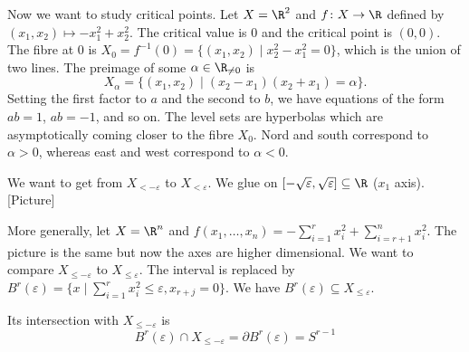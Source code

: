 \documentclass[A4paper, british]{amsart}
\theoremstyle{darkgreentheorem}
\theoremstyle{darkbluedefinition}
\theoremstyle{darkredexample}
\theoremstyle{remark}
\newcommand{\1}{\mathbbm{1}}
\newcommand{\sub}{\subseteq}
\begin{document}
Now we want to study critical points.
Let $X=\R^{2}$ and $f\colon X\to \R$ defined by $(x_{1},x_{2})\mapsto -x_{1}^{2}+x_{2}^{2}$.
The critical value is $0$ and the critical point is $(0,0)$.
The fibre at $0$ is $X_{0}=f^{-1}(0)=\{(x_{1},x_{2})\mid x_{2}^{2}-x_{1}^{2}=0 \}$, which is the union of two lines.
The preimage of some $\alpha\in \R_{\neq 0}$ is
\[ X_{\alpha}=\{(x_{1},x_{2})\mid (x_{2}-x_{1})(x_{2}+x_{1})=\alpha \}. \]
Setting the first factor to $a$ and the second to $b$, we have equations of the form $ab=1$, $ab=-1$, and so on.
The level sets are hyperbolas which are asymptotically coming closer to the fibre $X_{0}$.
Nord and south correspond to $\alpha>0$, whereas east and west correspond to $\alpha<0$.

We want to get from $X_{<-\varepsilon}$ to $X_{<\varepsilon }$.
We glue on $[-\sqrt{\varepsilon},\sqrt{\varepsilon}]\sub \R$ ($x_{1}$ axis).
[Picture]

More generally, let $X=\R^{n}$ and $f(x_{1},\ldots,x_{n})=-\sum_{i=1}^{r}x_{i}^{2}+\sum_{i=r+1}^{n}x_{i}^{2}$.
The picture is the same but now the axes are higher dimensional.
We want to compare $X_{\leqslant -\varepsilon }$ to $X_{\leqslant \varepsilon}$.
The interval is replaced by $B^{r}(\varepsilon)=\{x\mid \sum_{i=1}^{r}x_{i}^{2}\leqslant \varepsilon, x_{r+j}=0\}$.
We have $B^{r}(\varepsilon)\sub X_{\leqslant \varepsilon}$.

Its intersection with $X_{\leqslant -\varepsilon}$ is
\[ B^{r}(\varepsilon)\cap X_{\leqslant -\varepsilon }=\partial B^{r}(\varepsilon)=S^{r-1} \]
\end{document}
